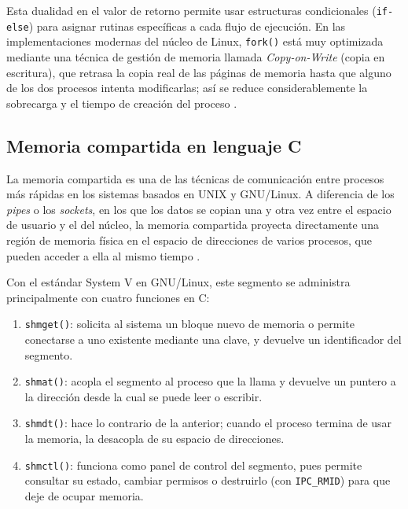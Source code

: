 Esta dualidad en el valor de retorno permite usar estructuras condicionales (\texttt{if-else}) para asignar rutinas específicas a cada flujo de ejecución. En las implementaciones modernas del núcleo de Linux, \texttt{fork()} está muy optimizada mediante una técnica de gestión de memoria llamada \textit{Copy-on-Write} (copia en escritura), que retrasa la copia real de las páginas de memoria hasta que alguno de los dos procesos intenta modificarlas; así se reduce considerablemente la sobrecarga y el tiempo de creación del proceso \cite{silberschatz:os-concepts:2018}.

\subsection{Memoria compartida en lenguaje C}
\label{sec:cap03:memcomp}

La memoria compartida es una de las técnicas de comunicación entre procesos más rápidas en los sistemas basados en UNIX y GNU/Linux. A diferencia de los \textit{pipes} o los \textit{sockets}, en los que los datos se copian una y otra vez entre el espacio de usuario y el del núcleo, la memoria compartida proyecta directamente una región de memoria física en el espacio de direcciones de varios procesos, que pueden acceder a ella al mismo tiempo \cite{kerrisk:linux-programming-interface:2010}.

Con el estándar System V en GNU/Linux, este segmento se administra principalmente con cuatro funciones en C:

\begin{enumerate}
    \item \texttt{shmget()}: solicita al sistema un bloque nuevo de memoria o permite conectarse a uno existente mediante una clave, y devuelve un identificador del segmento.
    \item \texttt{shmat()}: acopla el segmento al proceso que la llama y devuelve un puntero a la dirección desde la cual se puede leer o escribir.
    \item \texttt{shmdt()}: hace lo contrario de la anterior; cuando el proceso termina de usar la memoria, la desacopla de su espacio de direcciones.
    \item \texttt{shmctl()}: funciona como panel de control del segmento, pues permite consultar su estado, cambiar permisos o destruirlo (con \texttt{IPC\_RMID}) para que deje de ocupar memoria.
\end{enumerate}

